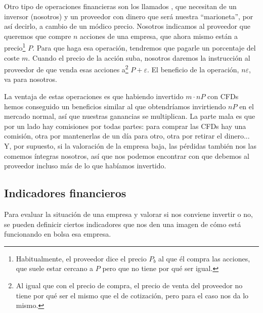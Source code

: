 \documentclass[nochap,palatino,notitlepage]{apuntes}
\begin{document}
Otro tipo de operaciones financieras son los llamados , que necesitan de un inversor (nosotros) y un proveedor con dinero que será nuestra ``marioneta'', por así decirlo, a cambio de un módico precio. Nosotros indicamos al proveedor que queremos que compre $n$ acciones de una empresa, que ahora mismo están a precio\footnote{Habitualmente, el proveedor dice el precio $P_b$ al que él compra las acciones, que suele estar cercano a $P$ pero que no tiene por qué ser igual.} $P$. Para que haga esa operación, tendremos que pagarle un porcentaje del coste $m$. Cuando el precio de la acción suba, nosotros daremos la instrucción al proveedor de que venda esas acciones a\footnote{Al igual que con el precio de compra, el precio de venta del proveedor no tiene por qué ser el mismo que el de cotización, pero para el caso nos da lo mismo.} $P + ε$. El beneficio de la operación, $nε$, va para nosotros.

La ventaja de estas operaciones es que habiendo invertido $m·nP$ con CFDs hemos conseguido un beneficios similar al que obtendríamos invirtiendo $nP$ en el mercado normal, así que nuestras ganancias se multiplican. La parte mala es que por un lado hay comisiones por todas partes: para comprar las CFDs hay una comisión, otra por mantenerlas de un día para otro, otra por retirar el dinero... Y, por supuesto, si la valoración de la empresa baja, las pérdidas también nos las comemos íntegras nosotros, así que nos podemos encontrar con que debemos al proveedor incluso más de lo que habíamos invertido.

\subsection{Indicadores financieros}
\label{sec:IndicadoresFinancieros}

Para evaluar la situación de una empresa y valorar si nos conviene invertir o no, se pueden definicir ciertos indicadores que nos den una imagen de cómo está funcionando en bolsa esa empresa.
\end{document}
